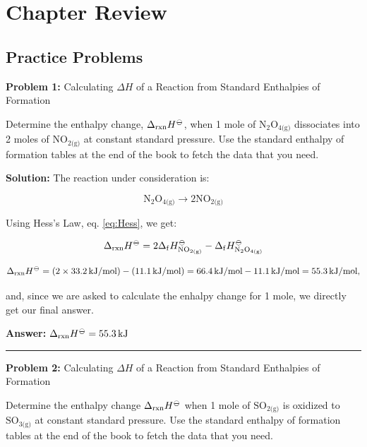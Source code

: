 \documentclass[
  9pt,
]{extbook}
\theoremstyle{definition}
\theoremstyle{definition}
\theoremstyle{definition}
\theoremstyle{definition}
\theoremstyle{remark}
\begin{document}
\section{Chapter Review}\label{rev4}

\subsection{Practice Problems}\label{exer4}

\textbf{Problem 1:} Calculating \(\Delta H\) of a Reaction from Standard Enthalpies of Formation

Determine the enthalpy change, \(\Delta_{\text{rxn}} H^{-\kern-6pt{\ominus}\kern-6pt-}\), when 1 mole of \(\text{N}_2 \text{O}_{4\text{(g)}}\) dissociates into 2 moles of \(\text{NO}_{2\text{(g)}}\) at constant standard pressure. Use the standard enthalpy of formation tables at the end of the book to fetch the data that you need.

\textbf{Solution:} The reaction under consideration is:

\[\text{N}_2 \text{O}_{4\text{(g)}} \rightarrow 2 \text{NO}_{2\text{(g)}}\]

Using Hess's Law, eq. \eqref{eq:Hess}, we get:

\[\Delta_{\text{rxn}} H^{-\kern-6pt{\ominus}\kern-6pt-}= 2 \Delta_{\mathrm{f}} H_{\text{NO}_{2\text{(g)}}}^{-\kern-6pt{\ominus}\kern-6pt-}-\Delta_{\mathrm{f}} H_{\text{N}_2 \text{O}_{4\text{(g)}}}^{-\kern-6pt{\ominus}\kern-6pt-}\]

\[\Delta_{\text{rxn}} H^{-\kern-6pt{\ominus}\kern-6pt-}= (2 \times 33.2 \, \text{kJ/mol}) - (11.1 \, \text{kJ/mol}) = 66.4 \, \text{kJ/mol} - 11.1 \, \text{kJ/mol} = 55.3 \, \text{kJ/mol},\]

and, since we are asked to calculate the enhalpy change for 1 mole, we directly get our final answer.

\textbf{Answer:} \(\Delta_{\text{rxn}} H^{-\kern-6pt{\ominus}\kern-6pt-}= 55.3 \, \text{kJ}\)

\begin{center}\rule{0.5\linewidth}{0.5pt}\end{center}

\textbf{Problem 2:} Calculating \(\Delta H\) of a Reaction from Standard Enthalpies of Formation

Determine the enthalpy change \(\Delta_{\text{rxn}} H^{-\kern-6pt{\ominus}\kern-6pt-}\) when 1 mole of \(\text{SO}_{2\text{(g)}}\) is oxidized to \(\text{SO}_{3\text{(g)}}\) at constant standard pressure. Use the standard enthalpy of formation tables at the end of the book to fetch the data that you need.
\end{document}
